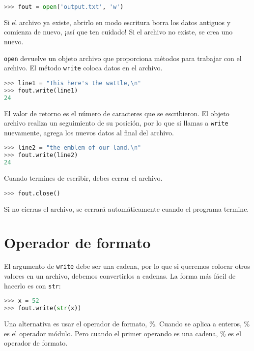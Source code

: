 \begin{lstlisting}[language=Python]
>>> fout = open('output.txt', 'w')
\end{lstlisting}

Si el archivo ya existe, abrirlo en modo escritura borra los datos antiguos y comienza de nuevo, ¡así que ten cuidado! Si el archivo no existe, se crea uno nuevo.

\texttt{open} devuelve un objeto archivo que proporciona métodos para trabajar con el archivo. El método \texttt{write} coloca datos en el archivo.

\begin{lstlisting}[language=Python]
>>> line1 = "This here's the wattle,\n"
>>> fout.write(line1)
24
\end{lstlisting}

El valor de retorno es el número de caracteres que se escribieron. El objeto archivo realiza un seguimiento de su posición, por lo que si llamas a \texttt{write} nuevamente, agrega los nuevos datos al final del archivo.

\begin{lstlisting}[language=Python]
>>> line2 = "the emblem of our land.\n"
>>> fout.write(line2)
24
\end{lstlisting}

Cuando termines de escribir, debes cerrar el archivo.

\begin{lstlisting}[language=Python]
>>> fout.close()
\end{lstlisting}

Si no cierras el archivo, se cerrará automáticamente cuando el programa termine.

\section{Operador de formato}

El argumento de \texttt{write} debe ser una cadena, por lo que si queremos colocar otros valores en un archivo, debemos convertirlos a cadenas. La forma más fácil de hacerlo es con \texttt{str}:

\begin{lstlisting}[language=Python]
>>> x = 52
>>> fout.write(str(x))
\end{lstlisting}

Una alternativa es usar el operador de formato, \%. Cuando se aplica a enteros, \% es el operador módulo. Pero cuando el primer operando es una cadena, \% es el operador de formato.

